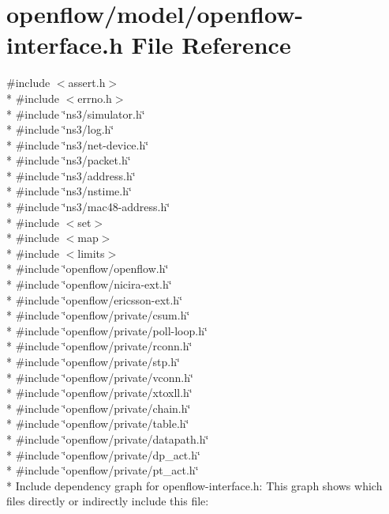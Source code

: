 \hypertarget{openflow-interface_8h}{}\section{openflow/model/openflow-\/interface.h File Reference}
\label{openflow-interface_8h}
{\ttfamily \#include $<$assert.\+h$>$}\\*
{\ttfamily \#include $<$errno.\+h$>$}\\*
{\ttfamily \#include \char`\"{}ns3/simulator.\+h\char`\"{}}\\*
{\ttfamily \#include \char`\"{}ns3/log.\+h\char`\"{}}\\*
{\ttfamily \#include \char`\"{}ns3/net-\/device.\+h\char`\"{}}\\*
{\ttfamily \#include \char`\"{}ns3/packet.\+h\char`\"{}}\\*
{\ttfamily \#include \char`\"{}ns3/address.\+h\char`\"{}}\\*
{\ttfamily \#include \char`\"{}ns3/nstime.\+h\char`\"{}}\\*
{\ttfamily \#include \char`\"{}ns3/mac48-\/address.\+h\char`\"{}}\\*
{\ttfamily \#include $<$set$>$}\\*
{\ttfamily \#include $<$map$>$}\\*
{\ttfamily \#include $<$limits$>$}\\*
{\ttfamily \#include \char`\"{}openflow/openflow.\+h\char`\"{}}\\*
{\ttfamily \#include \char`\"{}openflow/nicira-\/ext.\+h\char`\"{}}\\*
{\ttfamily \#include \char`\"{}openflow/ericsson-\/ext.\+h\char`\"{}}\\*
{\ttfamily \#include \char`\"{}openflow/private/csum.\+h\char`\"{}}\\*
{\ttfamily \#include \char`\"{}openflow/private/poll-\/loop.\+h\char`\"{}}\\*
{\ttfamily \#include \char`\"{}openflow/private/rconn.\+h\char`\"{}}\\*
{\ttfamily \#include \char`\"{}openflow/private/stp.\+h\char`\"{}}\\*
{\ttfamily \#include \char`\"{}openflow/private/vconn.\+h\char`\"{}}\\*
{\ttfamily \#include \char`\"{}openflow/private/xtoxll.\+h\char`\"{}}\\*
{\ttfamily \#include \char`\"{}openflow/private/chain.\+h\char`\"{}}\\*
{\ttfamily \#include \char`\"{}openflow/private/table.\+h\char`\"{}}\\*
{\ttfamily \#include \char`\"{}openflow/private/datapath.\+h\char`\"{}}\\*
{\ttfamily \#include \char`\"{}openflow/private/dp\+\_\+act.\+h\char`\"{}}\\*
{\ttfamily \#include \char`\"{}openflow/private/pt\+\_\+act.\+h\char`\"{}}\\*
Include dependency graph for openflow-\/interface.h\+:
This graph shows which files directly or indirectly include this file\+:
